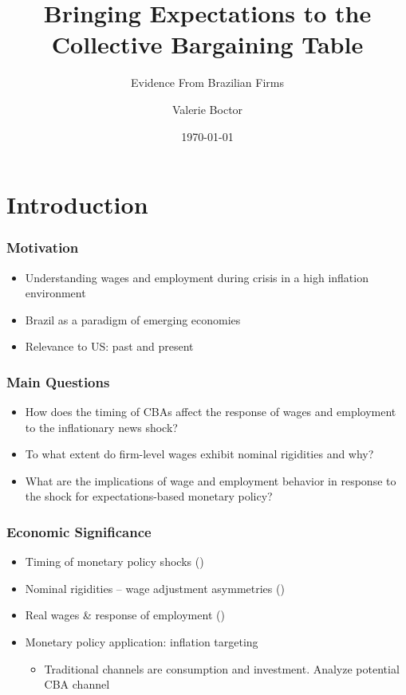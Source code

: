 \documentclass[aspectratio=169]{beamer}
\title{Bringing Expectations to the Collective Bargaining Table}
\author{Valerie Boctor}
\subtitle{Evidence From Brazilian Firms}
\date{\today}
\begin{document}
	\begin{frame}
	\titlepage
	\end{frame}



	\section{Introduction}
	\begin{frame}
		\frametitle{Motivation}
		\begin{itemize}
			\item Understanding wages and employment during crisis in a high inflation environment
			\item Brazil as a paradigm of emerging economies
			\item Relevance to US: past and present
		\end{itemize}
	\end{frame}

	\begin{frame}
	\frametitle{Main Questions}
		\begin{itemize}
			\item How does the timing of CBAs affect the response of wages and employment to the inflationary news shock?
			\item To what extent do firm-level wages exhibit nominal rigidities and why?
			\item What are the implications of wage and employment behavior in response to the shock for expectations-based monetary policy?
		\end{itemize}
	\end{frame}

	\begin{frame}
	\frametitle{Economic Significance}
		\begin{itemize}
			\item Timing of monetary policy shocks (\cite{oliveiTimingMonetaryPolicy2007})
			\item Nominal rigidities \--- wage adjustment asymmetries (\cite{taylorStayingPowerStaggered2016})
			 \item Real wages \& response of employment (\cite{cardUnexpectedInflationReal1990})
			 \item Monetary policy application: inflation targeting
				\begin{itemize}
					\item Traditional channels are consumption and investment. Analyze potential CBA channel
				\end{itemize}
		\end{itemize}
	\end{frame}
\end{document}
